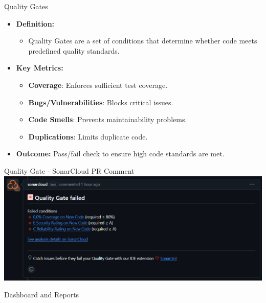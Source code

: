\documentclass{beamer}
\begin{document}
\begin{frame}{Quality Gates}
  \begin{itemize}
    \item \textbf{Definition:}
    \begin{itemize}
      \item Quality Gates are a set of conditions that determine whether code meets predefined quality standards.
    \end{itemize}

    \vspace*{1em}

    \item \textbf{Key Metrics:}
    \begin{itemize}
        \item \textbf{Coverage}: Enforces sufficient test coverage.
        \item \textbf{Bugs/Vulnerabilities}: Blocks critical issues.
        \item \textbf{Code Smells}: Prevents maintainability problems.
        \item \textbf{Duplications}: Limits duplicate code.
    \end{itemize}
    
    \vspace*{1em}

    \item \textbf{Outcome:}
    Pass/fail check to ensure high code standards are met.
  \end{itemize}
\end{frame}

\begin{frame}{Quality Gate - SonarCloud PR Comment}
  \includegraphics[width=1.0\textwidth]{fig/q-gate-1.png}
\end{frame}

\begin{frame}{Dashboard and Reports}
 
\end{frame}
\end{document}
